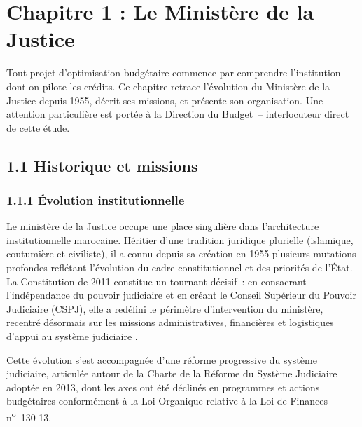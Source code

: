﻿
\section*{Chapitre 1 : Le Minist\`ere de la Justice}

\bigskip

Tout projet d'optimisation budgétaire commence par comprendre l'institution dont on pilote les crédits. Ce chapitre retrace l'évolution du Ministère de la Justice depuis 1955, décrit ses missions, et présente son organisation. Une attention particulière est portée à la Direction du Budget~-- interlocuteur direct de cette étude.
\subsection*{1.1 \quad Historique et missions}

\subsubsection*{1.1.1 \quad \'Evolution institutionnelle}

Le minist\`ere de la Justice occupe une place singuli\`ere dans l'architecture institutionnelle marocaine. H\'eritier d'une tradition juridique plurielle (islamique, coutumi\`ere et civiliste), il a connu depuis sa cr\'eation en 1955 plusieurs mutations profondes refl\'etant l'\'evolution du cadre constitutionnel et des priorit\'es de l'\'Etat. La Constitution de 2011 constitue un tournant d\'ecisif~: en consacrant l'ind\'ependance du pouvoir judiciaire et en cr\'eant le Conseil Sup\'erieur du Pouvoir Judiciaire (CSPJ), elle a red\'efini le p\'erim\`etre d'intervention du minist\`ere, recentr\'e d\'esormais sur les missions administratives, financi\`eres et logistiques d'appui au syst\`eme judiciaire \citep{MEF2015}.

Cette \'evolution s'est accompagn\'ee d'une r\'eforme progressive du syst\`eme judiciaire, articul\'ee autour de la Charte de la R\'eforme du Syst\`eme Judiciaire adopt\'ee en 2013, dont les axes ont \'et\'e d\'eclin\'es en programmes et actions budg\'etaires conform\'ement \`a la Loi Organique relative \`a la Loi de Finances n\textsuperscript{o}~130-13.

